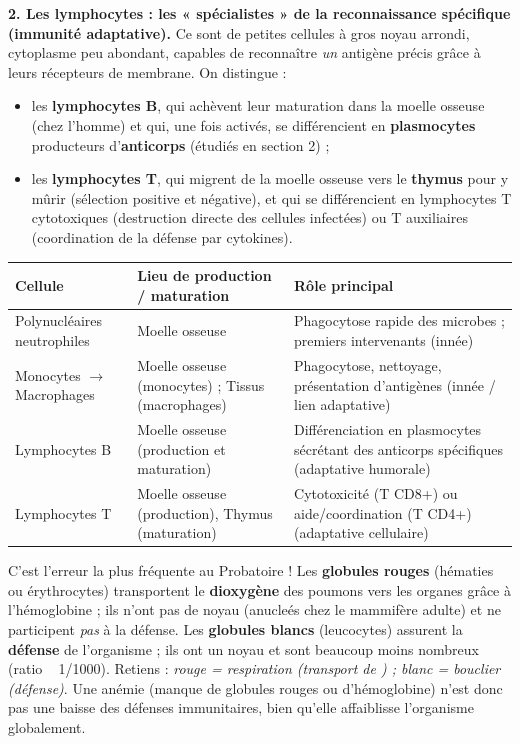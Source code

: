 \documentclass[11pt]{article}
\begin{document}
\textbf{2. Les lymphocytes : les « spécialistes » de la reconnaissance spécifique (immunité adaptative).} Ce sont de petites cellules à gros noyau arrondi, cytoplasme peu abondant, capables de reconnaître \emph{un} antigène précis grâce à leurs récepteurs de membrane. On distingue :
\begin{itemize}
\item les \textbf{lymphocytes B}, qui achèvent leur maturation dans la moelle osseuse (chez l'homme) et qui, une fois activés, se différencient en \textbf{plasmocytes} producteurs d'\textbf{anticorps} (étudiés en section 2) ;
\item les \textbf{lymphocytes T}, qui migrent de la moelle osseuse vers le \textbf{thymus} pour y mûrir (sélection positive et négative), et qui se différencient en lymphocytes T cytotoxiques (destruction directe des cellules infectées) ou T auxiliaires (coordination de la défense par cytokines).
\end{itemize}

\begin{center}
\begin{tabularx}{\linewidth}{|l|X|X|}
\hline
\rowcolor{popblueL} \textbf{Cellule} & \textbf{Lieu de production / maturation} & \textbf{Rôle principal} \\
\hline
Polynucléaires neutrophiles & Moelle osseuse & Phagocytose rapide des microbes ; premiers intervenants (innée) \\
\hline
Monocytes $\rightarrow$ Macrophages & Moelle osseuse (monocytes) ; Tissus (macrophages) & Phagocytose, nettoyage, présentation d'antigènes (innée / lien adaptative) \\
\hline
Lymphocytes B & Moelle osseuse (production et maturation) & Différenciation en plasmocytes sécrétant des anticorps spécifiques (adaptative humorale) \\
\hline
Lymphocytes T & Moelle osseuse (production), Thymus (maturation) & Cytotoxicité (T CD8+) ou aide/coordination (T CD4+) (adaptative cellulaire) \\
\hline
\end{tabularx}
\end{center}

\begin{attention}
C'est l'erreur la plus fréquente au Probatoire ! Les \textbf{globules rouges} (hématies ou érythrocytes) transportent le \textbf{dioxygène} des poumons vers les organes grâce à l'hémoglobine ; ils n'ont pas de noyau (anucleés chez le mammifère adulte) et ne participent \emph{pas} à la défense. Les \textbf{globules blancs} (leucocytes) assurent la \textbf{défense} de l'organisme ; ils ont un noyau et sont beaucoup moins nombreux (ratio ~ 1/1000). Retiens : \emph{rouge = respiration (transport de ) ; blanc = bouclier (défense)}. Une anémie (manque de globules rouges ou d'hémoglobine) n'est donc pas une baisse des défenses immunitaires, bien qu'elle affaiblisse l'organisme globalement.
\end{attention}
\end{document}
